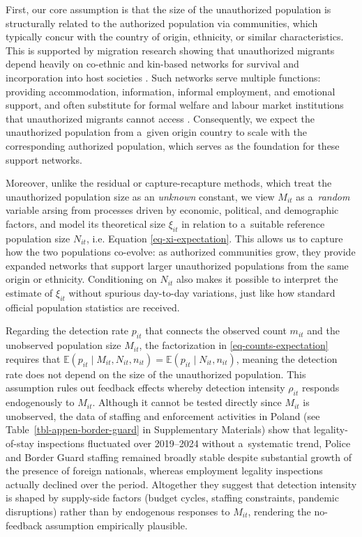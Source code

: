 First, our core assumption is that the size of the unauthorized population is structurally related to the authorized population via communities, which typically concur with the country of origin, ethnicity, or similar characteristics. This is supported by migration research showing that unauthorized migrants depend heavily on co-ethnic and kin-based networks for survival and incorporation into host societies
\citep{Hagan1998, Engbersen2001, Ambrosini2023}. Such networks serve multiple functions: providing accommodation, information, informal
employment, and emotional support, and often substitute for formal welfare and labour market institutions that unauthorized migrants cannot
access \citep{Anderson2007, McDowell2009}. Consequently, we expect the unauthorized population from a~given origin country to scale with the
corresponding authorized population, which serves as the foundation for these support networks.

Moreover, unlike the residual or capture-recapture methods, which treat the unauthorized population size as an \emph{unknown} constant, we view $M_{it}$ as a~\emph{random} variable arsing from processes driven by economic, political, and demographic factors, and model its theoretical size $\xi_{it}$ in relation to a~suitable reference population size $N_{it}$, i.e. Equation \eqref{eq-xi-expectation}. This allows us to capture how the two populations co-evolve: as authorized communities grow, they provide expanded networks that support larger unauthorized populations from the same origin or ethnicity. Conditioning on $N_{it}$ also makes it possible to interpret the estimate of $\xi_{it}$ without spurious day-to-day variations, just like how standard official population statistics are received. 

Regarding the detection rate $p_{it}$ that connects the observed count $m_{it}$ and the unobserved population size $M_{it}$, the factorization in \eqref{eq-counts-expectation} requires that $\mathbb{E}(p_{it} \mid M_{it}, N_{it}, n_{it}) = \mathbb{E}(p_{it} \mid N_{it}, n_{it})$,
meaning the detection rate does not depend on the size of the unauthorized population. This assumption rules out feedback
effects whereby detection intensity $\rho_{it}$ responds endogenously to $M_{it}$. Although it cannot be tested directly since $M_{it}$ is unobserved, the data of staffing and enforcement activities in Poland (see Table~\ref{tbl-appen-border-guard} in Supplementary Materials) show that legality-of-stay inspections fluctuated over 2019--2024 without a~systematic trend, Police and Border Guard staffing remained broadly stable despite substantial growth of the presence of foreign nationals, whereas employment legality inspections actually declined over the period. Altogether they suggest that detection intensity is shaped by supply-side factors (budget cycles, staffing constraints, pandemic disruptions) rather than by endogenous responses to $M_{it}$, rendering the no-feedback assumption empirically plausible.

